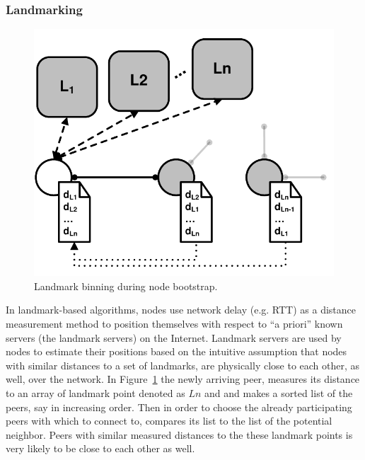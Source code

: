 \subsubsection{Landmarking}\label{sec:landmark}

\begin{figure}[ht]
\centering
  \includegraphics[scale=0.4]{img/pdf/landmarking.pdf}
\caption{Landmark binning during node bootstrap.}
\label{figure:landmarking}
\end{figure}

In landmark-based algorithms, nodes use network delay (e.g. RTT) as a
distance measurement method to position themselves with respect to ``a priori''
known servers (the landmark servers) on the Internet. Landmark servers are used
by nodes to estimate their positions based on the intuitive assumption that
nodes
with similar distances to a set of landmarks, are physically close to each
other, as well, over the network. In Figure~\ref{figure:landmarking} the newly
arriving peer, measures its distance to an array of landmark point denoted as
$Ln$ and and makes a sorted list of the peers, say in increasing order. Then in
order to choose the already participating peers with which to connect to,
compares its list to the list of the potential neighbor. Peers with similar
measured distances to the these landmark points is very likely to be close to
each other as well.

